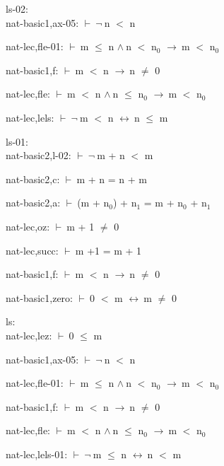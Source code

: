 \documentclass[a4paper]{article}
\newcommand{\Fol}{\mbox{$\vdash\ $}}
\newcommand{\Not}{\mbox{$\neg\ $}}
\newcommand{\And}{\mbox{$\wedge\ $}}
\newcommand{\Imp}{\mbox{$\rightarrow\ $}}
\newcommand{\Equiv}{\mbox{$\leftrightarrow\ $}}
\begin{document}
ls-02:\\ nat-basic1,ax-05: 
 \Fol \Not n $<$ n



nat-lec,fle-01: 
 \Fol m $\le$ n \And n $<$ $\mbox{n}_{0}$ \Imp m $<$ $\mbox{n}_{0}$



nat-basic1,f: 
 \Fol m $<$ n \Imp n $\neq$ 0



nat-lec,fle: 
 \Fol m $<$ n \And n $\le$ $\mbox{n}_{0}$ \Imp m $<$ $\mbox{n}_{0}$



nat-lec,lels: 
 \Fol \Not m $<$ n \Equiv n $\le$ m



\bigskip

ls-01:\\ nat-basic2,l-02: 
 \Fol \Not m + n $<$ m



nat-basic2,c: 
 \Fol m + n = n + m



nat-basic2,a: 
 \Fol (m + $\mbox{n}_{0}$) + $\mbox{n}_{1}$ = m + $\mbox{n}_{0}$ + $\mbox{n}_{1}$



nat-lec,oz: 
 \Fol m + 1 $\neq$ 0



nat-lec,succ: 
 \Fol m +1 = m + 1



nat-basic1,f: 
 \Fol m $<$ n \Imp n $\neq$ 0



nat-basic1,zero: 
 \Fol 0 $<$ m \Equiv m $\neq$ 0



\bigskip

ls:\\ nat-lec,lez: 
 \Fol 0 $\le$ m



nat-basic1,ax-05: 
 \Fol \Not n $<$ n



nat-lec,fle-01: 
 \Fol m $\le$ n \And n $<$ $\mbox{n}_{0}$ \Imp m $<$ $\mbox{n}_{0}$



nat-basic1,f: 
 \Fol m $<$ n \Imp n $\neq$ 0



nat-lec,fle: 
 \Fol m $<$ n \And n $\le$ $\mbox{n}_{0}$ \Imp m $<$ $\mbox{n}_{0}$



nat-lec,lels-01: 
 \Fol \Not m $\le$ n \Equiv n $<$ m
\end{document}
